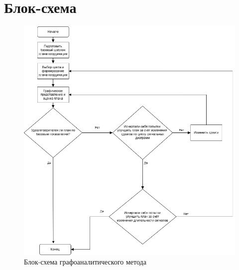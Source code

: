 \documentclass[12pt]{article}
\begin{document}
\section{Блок-схема}
\begin{figure}[h!]
  \centering
  \includegraphics[width=1.1\textwidth]{Block_diagram.png} 
  \caption{Блок-схема графоаналитического метода} 
  \label{fig:diagram} 
\end{figure}
\end{document}
